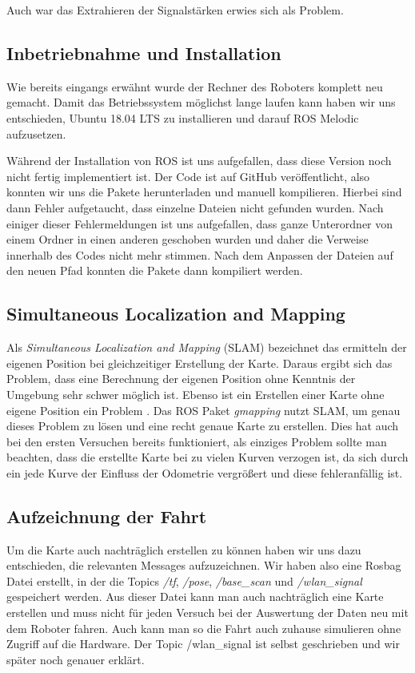 \documentclass{scrartcl}%
\begin{document}
Auch war das Extrahieren der Signalstärken erwies sich als Problem.

\subsection{Inbetriebnahme und Installation}
Wie bereits eingangs erwähnt wurde der Rechner des Roboters komplett neu gemacht. Damit das Betriebssystem möglichst lange laufen kann haben wir uns entschieden, Ubuntu 18.04 LTS zu installieren und darauf ROS Melodic aufzusetzen.

Während der Installation von ROS ist uns aufgefallen, dass diese Version noch nicht fertig implementiert ist. Der Code ist auf GitHub veröffentlicht, also konnten wir uns die Pakete herunterladen und manuell kompilieren. Hierbei sind dann Fehler aufgetaucht, dass einzelne Dateien nicht gefunden wurden. Nach einiger dieser Fehlermeldungen ist uns aufgefallen, dass ganze Unterordner von einem Ordner in einen anderen geschoben wurden und daher die Verweise innerhalb des Codes nicht mehr stimmen. Nach dem Anpassen der Dateien auf den neuen Pfad konnten die Pakete dann kompiliert werden.

\subsection{Simultaneous Localization and Mapping}
Als \textit{Simultaneous Localization and Mapping} (SLAM) bezeichnet das ermitteln der eigenen Position bei gleichzeitiger Erstellung der Karte. Daraus ergibt sich das Problem, dass eine Berechnung der eigenen Position ohne Kenntnis der Umgebung sehr schwer möglich ist. Ebenso ist ein Erstellen einer Karte ohne eigene Position ein Problem \cite{slam}. Das ROS Paket \textit{gmapping} nutzt SLAM, um genau dieses Problem zu lösen und eine recht genaue Karte zu erstellen. Dies hat auch bei den ersten Versuchen bereits funktioniert, als einziges Problem sollte man beachten, dass die erstellte Karte bei zu vielen Kurven verzogen ist, da sich durch ein jede Kurve der Einfluss der Odometrie vergrößert und diese fehleranfällig ist.

\subsection{Aufzeichnung der Fahrt}
Um die Karte auch nachträglich erstellen zu können haben wir uns dazu entschieden, die relevanten Messages aufzuzeichnen. Wir haben also eine Rosbag Datei erstellt, in der die Topics \textit{/tf}, \textit{/pose}, \textit{/base\_scan} und \textit{/wlan\_signal} gespeichert werden. Aus dieser Datei kann man auch nachträglich eine Karte erstellen und muss nicht für jeden Versuch bei der Auswertung der Daten neu mit dem Roboter fahren. Auch kann man so die Fahrt auch zuhause simulieren ohne Zugriff auf die Hardware. Der Topic /wlan\_signal ist selbst geschrieben und wir später noch genauer erklärt.
\end{document}
